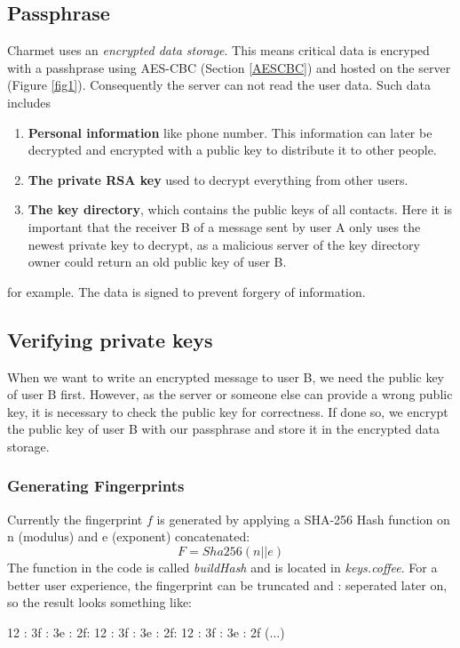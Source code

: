 \documentclass{scrartcl}
\begin{document}
\subsection{Passphrase}
Charmet uses an \textit{encrypted data storage}. This means critical data is encryped with a passhprase using AES-CBC (Section \ref{AESCBC}) and hosted on the server  (Figure \ref{fig1}). Consequently the server can not read the user data. Such data includes
\begin{enumerate}
\item \textbf{Personal information} like phone number. This information can later be decrypted and encrypted with a public key to distribute it to other people.
\item \textbf{The private RSA key} used to decrypt everything from other users.
\item \textbf{ The key directory}, which contains the public keys of all contacts. Here it is important that the receiver B of a message sent by user A only uses the newest private key to decrypt, as a malicious server of the key directory owner could return an old public key of user B.
\end{enumerate}
for example. The data is signed to prevent forgery of information.

\subsection{Verifying private keys}
When we want to write an encrypted message to user B, we need the public key of user B first. However, as the server or someone else can provide a wrong public key, it is necessary to check the public key for correctness. If done so, we encrypt the public key of user B with our passphrase and store it in the encrypted data storage.
 
\subsubsection{Generating Fingerprints}
   Currently the fingerprint $f$ is generated by applying a SHA-256 Hash function on n (modulus) and e (exponent) concatenated:
   $$
   F = Sha256(n || e)
   $$
   The function in the code is called \textit{buildHash} and is located in \textit{keys.coffee}. For a better user experience, the fingerprint can be truncated and : seperated later on, so the result looks something like:
  
   \begin{center}
   12 : 3f : 3e : 2f: 12 : 3f : 3e : 2f: 12 : 3f : 3e : 2f (...)
   \end{center}
  
\end{document}
